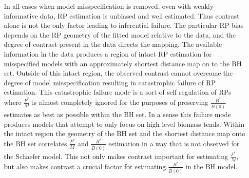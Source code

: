 %
In all cases when model misspecification is removed, even with weakly 
informative data, RP estimation is unbiased and well estimated. Thus contrast 
alone is not the only factor leading to inferential failure. The particular RP 
bias depends on the RP geometry of the fitted model relative to the data, and 
the degree of contrast present in the data directs the mapping. 
The available information in the data produces a region of intact RP estimation 
for misspecified models with an approximately shortest distance map on to the BH set. 
Outside of this intact region, the observed contrast cannot overcome the 
degree of model misspecification resulting in catastrophic failure of RP estimation.  
This catastrophic failure mode is a sort of self regulation of RPs where $\frac{F^*}{M}$ 
is almost completely ignored for the purposes of preserving $\frac{B^*}{\bar B(0)}$ 
estimates as best as possible within the BH set. In a sense this failure mode produces 
models that attempt to only focus on high level biomass tends.
%
Within the intact region the geometry of the BH set and the shortest distance map onto the BH set 
correlates $\frac{F^*}{M}$ and $\frac{B^*}{\bar B(0)}$ estimation in a way that is 
not observed for the Schaefer model.
This not only makes %
contrast important for estimating $\frac{F^*}{M}$, but 
also makes contrast a crucial factor for estimating $\frac{B^*}{\bar B(0)}$ in the BH model. 




